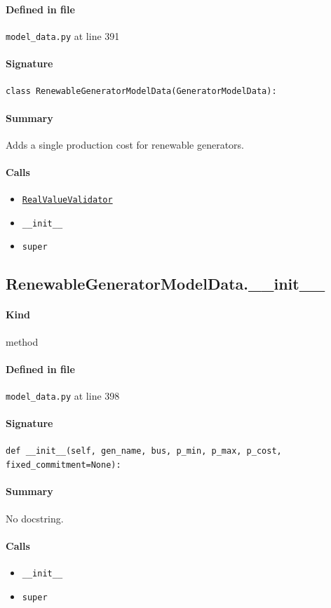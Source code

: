 \documentclass[11pt]{report}
\begin{document}
\paragraph{Defined in file} \texttt{model\_data.py} at line 391
\paragraph{Signature} \texttt{class RenewableGeneratorModelData(GeneratorModelData):}
\paragraph{Summary} Adds a single production cost for renewable generators.
\paragraph{Calls}
\begin{itemize}[leftmargin=*]
  \item \hyperref[def:model_data.py:RealValueValidator:L58]{\texttt{RealValueValidator}}
  \item \texttt{\_\_init\_\_}
  \item \texttt{super}
\end{itemize}
\subsection{RenewableGeneratorModelData.\_\_init\_\_}
\label{def:model_data.py:RenewableGeneratorModelData.__init__:L398}
\paragraph{Kind} method
\paragraph{Defined in file} \texttt{model\_data.py} at line 398
\paragraph{Signature} \texttt{def \_\_init\_\_(self, gen\_name, bus, p\_min, p\_max, p\_cost, fixed\_commitment=None):}
\paragraph{Summary} No docstring.
\paragraph{Calls}
\begin{itemize}[leftmargin=*]
  \item \texttt{\_\_init\_\_}
  \item \texttt{super}
\end{itemize}
\end{document}
